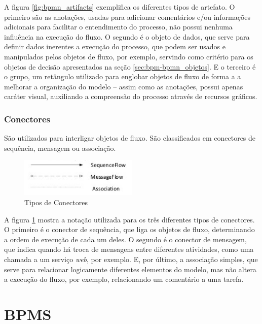     A figura \ref{fig:bpmn_artifacts} exemplifica os diferentes tipos de artefato. O primeiro são as anotações, usadas para adicionar comentários e/ou informações adicionais para facilitar o entendimento do processo, não possui nenhuma influência na execução do fluxo. O segundo é o objeto de dados, que serve para definir dados inerentes a execução do processo, que podem ser usados e manipulados pelos objetos de fluxo, por exemplo, servindo como critério para os objetos de decisão apresentados na seção \ref{sec:bpm-bpmn_objetos}. E o terceiro é o grupo, um retângulo utilizado para englobar objetos de fluxo de forma a a melhorar a organização do modelo -- assim como as anotações, possui apenas caráter visual, auxiliando a compreensão do processo através de recursos gráficos.


\subsubsection{Conectores}\label{sec:bpm-bpmn_objetos_conectores}

    São utilizados para interligar objetos de fluxo. São classificados em conectores de sequência, mensagem ou associação.

    \begin{figure}[H]
    \centering
    \includegraphics[width=0.5\textwidth]{imagens/bpmn_connectors.jpg}
    \caption{Tipos de Conectores}
    \label{fig:bpmn_conectors}
    \end{figure}
    
    A figura \ref{fig:bpmn_conectors} mostra a notação utilizada para os três diferentes tipos de conectores. O primeiro é o conector de sequência, que liga os objetos de fluxo, determinando a ordem de execução de cada um deles. O segundo é o conector de mensagem, que indica quando há troca de mensagens entre diferentes atividades, como uma chamada a um serviço \textit{web}, por exemplo. E, por último, a associação simples, que serve para relacionar logicamente diferentes elementos do modelo, mas não altera a execução do fluxo, por exemplo, relacionando um comentário a uma tarefa. 


\section{BPMS}\label{sec:automatizacao-processos-bpms}

